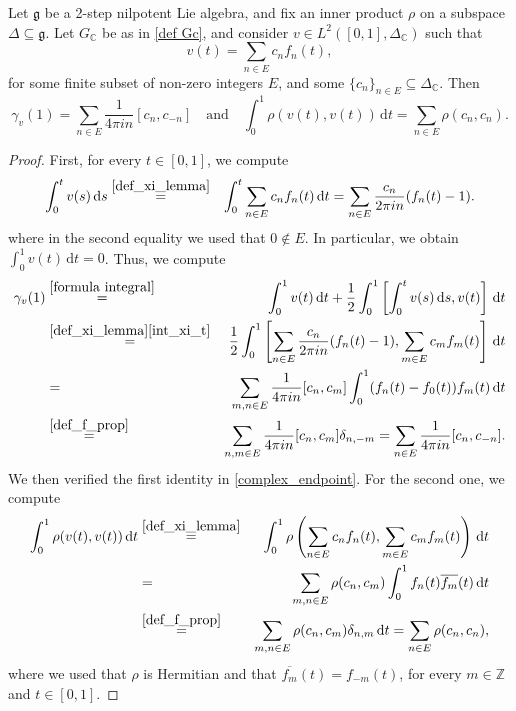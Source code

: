 \documentclass[10pt,a4paper]{amsart}
\newcommand{\C}{\mathbb C}
\newcommand{\Z}{\mathbb Z}
\newcommand{\de}{\mathrm{d}}
\newcommand{\g}{\mathfrak{g}}
\begin{document}
\begin{lemma} \label{lemma lemma}
 Let $\g$ be a 2-step nilpotent Lie algebra, and fix an inner product $\rho$ on a subspace $\Delta \subseteq \g$. Let $G_\C$ be as in \eqref{def Gc}, and consider $v \in L^2([0,1],\Delta_\C)$ such that
 \begin{equation} \label{def_xi_lemma}
 v(t) = \sum_{n \in E} c_nf_n(t), 
 \end{equation}
 for some finite subset of non-zero integers $E$, and some $\{c_n\}_{n\in E} \subseteq \Delta_\C$. Then
 \begin{equation} \label{complex_endpoint_1}
 \gamma_v(1) = \sum_{n \in E} \frac{1}{4 \pi i n} [c_n,c_{-n}] \quad \text{and} \quad \int^1_0 \rho(v(t),v(t)) \, \de t
 = \sum_{n \in E} \rho(c_n,c_n).
\end{equation}
\end{lemma}

\begin{proof}
 First, for every $t \in [0,1]$, we compute
 \begin{eqnarray} \label{int_xi_t}
 \int^t_0 v(s) \, \de s &\stackrel{\eqref{def_xi_lemma}}{=}& \int^t_0 \sum_{n \in E} c_nf_n(t) \, \de t = \sum_{n \in E} \frac{c_n}{2 \pi i n}(f_n(t)-1).
 \end{eqnarray}
 where in the second equality we used that $0 \notin E$. In particular, we obtain $\int^1_0 v(t) \, \de t = 0$. Thus, we compute
 \begin{eqnarray*}
 \gamma_v(1) &\stackrel{\eqref{formula integral}}{=}& \int^1_0 v(t) \, \de t + 
 \frac{1}{2} \int^1_0 \left[\int^t_0 v(s) \, \de s, v(t) \right] \, \de t \\ &\stackrel{\eqref{def_xi_lemma}\eqref{int_xi_t}}{=}& \frac{1}{2} \int^1_0 \left[ \sum_{n \in E} \frac{c_n}{2 \pi i n}(f_n(t)-1), \sum_{m \in E} c_mf_m(t)\right] \, \de t \\
 &=& \sum_{m,n \in E} \frac{1}{4\pi i n} [c_n,c_m] \int^1_0 (f_n(t)-f_0(t))f_m(t) \, \de t \\
 &\stackrel{\eqref{def_f_prop}}{=}& \sum_{n,m \in E} \frac{1}{4\pi in} [c_n,c_{m}]\delta_{n,-m} = \sum_{n \in E} \frac{1}{4\pi in} [c_n,c_{-n}]. 
 \end{eqnarray*} 
 We then verified the first identity in \eqref{complex_endpoint}. For the second one, we compute 
 \begin{eqnarray*}
 \int^1_0 \rho(v(t),v(t)) \, \de t &\stackrel{\eqref{def_xi_lemma}}{=}& \int^1_0 \rho\left(\sum_{n \in E} c_nf_n(t),\sum_{m \in E} c_mf_m(t)\right) \, \de t \\
 &=& \sum_{m,n \in E} \rho(c_n,c_m)\int^1_0 f_n(t)\overline{f_m}(t) \, \de t \\
 &\stackrel{\eqref{def_f_prop}}{=}& \sum_{m,n \in E} \rho(c_n,c_m) \delta_{n,m} \, \de t = \sum_{n \in E} \rho(c_n,c_n),
 \end{eqnarray*}
 where we used that $\rho$ is Hermitian and that $\overline{f_m}(t)=f_{-m}(t)$, for every $m \in \Z$ and $t \in [0,1]$.
 \end{proof}
\end{document}
